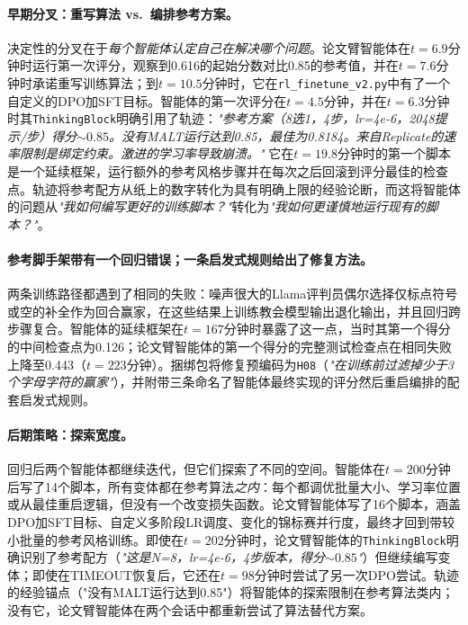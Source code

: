 \paragraph{早期分叉：重写算法 vs.\ 编排参考方案。}
决定性的分叉在于\emph{每个智能体认定自己在解决哪个问题}。论文臂智能体在$t = 6.9$分钟时运行第一次评分，观察到0.616的起始分数对比0.85的参考值，并在$t = 7.6$分钟时承诺重写训练算法；到$t = 10.5$分钟时，它在\texttt{rl\_finetune\_v2.py}中有了一个自定义的DPO加SFT目标。\ara{}智能体的第一次评分在$t = 4.5$分钟，并在$t = 6.3$分钟时其\texttt{ThinkingBlock}明确引用了轨迹：\emph{"参考方案（8选1，4步，lr=4e-6，2048提示/步）得分${\sim}0.85$。没有MALT运行达到0.85，最佳为0.8184。来自Replicate的速率限制是绑定约束。激进的学习率导致崩溃。"} 它在$t = 19.8$分钟时的第一个脚本是一个延续框架，运行额外的参考风格步骤并在每次之后回滚到评分最佳的检查点。轨迹将参考配方从纸上的数字转化为具有明确上限的经验论断，而这将智能体的问题从\emph{"我如何编写更好的训练脚本？"}转化为\emph{"我如何更谨慎地运行现有的脚本？"}。

\paragraph{参考脚手架带有一个回归错误；一条启发式规则给出了修复方法。}
两条训练路径都遇到了相同的失败：噪声很大的Llama评判员偶尔选择仅标点符号或空的补全作为回合赢家，在这些结果上训练教会模型输出退化输出，并且回归跨步骤复合。\ara{}智能体的延续框架在$t = 167$分钟时暴露了这一点，当时其第一个得分的中间检查点为0.126；论文臂智能体的第一个得分的完整测试检查点在相同失败上降至0.443（$t = 223$分钟）。\ara{}捆绑包将修复预编码为\texttt{H08}（\emph{"在训练前过滤掉少于3个字母字符的赢家"}），并附带三条命名了\ara{}智能体最终实现的评分然后重启编排的配套启发式规则。

\paragraph{后期策略：探索宽度。}
回归后两个智能体都继续迭代，但它们探索了不同的空间。\ara{}智能体在$t = 200$分钟后写了14个脚本，所有变体都在参考算法\emph{之内}：每个都调优批量大小、学习率位置或从最佳重启逻辑，但没有一个改变损失函数。论文臂智能体写了16个脚本，涵盖DPO加SFT目标、自定义多阶段LR调度、变化的锦标赛并行度，最终才回到带较小批量的参考风格训练。即使在$t = 202$分钟时，论文臂智能体的\texttt{ThinkingBlock}明确识别了参考配方（\emph{"这是N=8，lr=4e-6，4步版本，得分${\sim}0.85$"}）但继续编写变体；即使在TIMEOUT恢复后，它还在$t = 98$分钟时尝试了另一次DPO尝试。轨迹的经验锚点（"没有MALT运行达到0.85"）将\ara{}智能体的探索限制在参考算法类内；没有它，论文臂智能体在两个会话中都重新尝试了算法替代方案。

